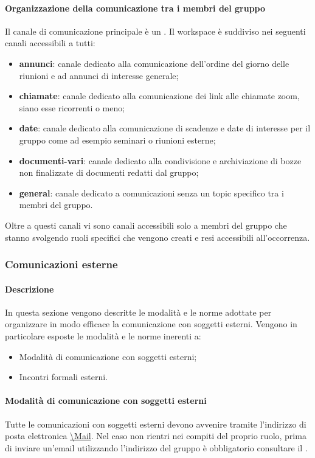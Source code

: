\paragraph{Organizzazione della comunicazione tra i membri del gruppo}
Il canale di comunicazione principale è un  .
Il workspace è suddiviso nei seguenti canali accessibili a tutti:
\begin{itemize}
\item \textbf{annunci}: canale dedicato alla comunicazione dell'ordine del giorno delle riunioni e ad annunci di interesse generale;
\item \textbf{chiamate}: canale dedicato alla comunicazione dei link alle chiamate zoom, siano esse ricorrenti o meno;
\item \textbf{date}: canale dedicato alla comunicazione di scadenze e date di interesse per il gruppo come ad esempio seminari o riunioni esterne;
\item \textbf{documenti-vari}: canale dedicato alla condivisione e archiviazione di bozze non finalizzate di documenti redatti dal gruppo;
\item \textbf{general}: canale dedicato a comunicazioni senza un topic specifico tra i membri del gruppo.
\end{itemize}
Oltre a questi canali vi sono canali accessibili solo a membri del gruppo che stanno svolgendo ruoli specifici che vengono creati e resi accessibili all'occorrenza.
\subsubsection{Comunicazioni esterne}
\paragraph{Descrizione}
In questa sezione vengono descritte le modalità e le norme adottate per organizzare in modo efficace la comunicazione con soggetti esterni.
Vengono in particolare esposte le modalità e le norme inerenti a:
\begin{itemize}
\item Modalità di comunicazione con soggetti esterni;
\item Incontri formali esterni.
\end{itemize}
\paragraph{Modalità di comunicazione con soggetti esterni}
Tutte le comunicazioni con soggetti esterni devono avvenire tramite l'indirizzo di posta elettronica \url{\Mail}. Nel caso non rientri nei compiti del proprio ruolo, prima di inviare un'email utilizzando l'indirizzo del gruppo è obbligatorio consultare il \RdP{}.
